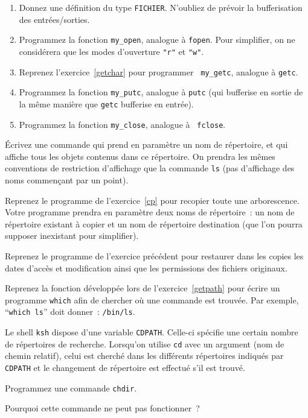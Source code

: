 \begin {enumerate}
    \item Donnez une définition du type {\tt FICHIER}.  N'oubliez de
	prévoir la bufferisation des entrées/sorties.

    \item Programmez la fonction {\tt my\_open}, analogue à {\tt fopen}.
	Pour simplifier, on ne considérera que les modes d'ouverture
	\verb|"r"| et \verb|"w"|.

    \item Reprenez l'exercice~\ref {getchar} pour programmer {\tt
	my\_getc}, analogue à {\tt getc}.

    \item Programmez la fonction {\tt my\_putc}, analogue à {\tt putc}
	(qui bufferise en sortie de la même manière que \texttt {getc}
	bufferise en entrée).

    \item Programmez la fonction {\tt my\_close}, analogue à {\tt
	fclose}.

\end {enumerate}



\question

Écrivez une commande qui prend en paramètre un nom de répertoire, et
qui affiche tous les objets contenus dans ce répertoire. On prendra les
mêmes conventions de restriction d'affichage que la commande {\tt ls}
(pas d'affichage des noms commençant par un point).


\question

Reprenez le programme de l'exercice~\ref {cp} pour recopier toute
une arborescence. Votre programme prendra en paramètre deux noms
de répertoire~: un nom de répertoire existant à copier et un nom
de répertoire destination (que l'on pourra supposer inexistant pour
simplifier).


\question

Reprenez le programme de l'exercice précédent pour restaurer dans les
copies les dates d'accès et modification ainsi que les permissions des
fichiers originaux.


\question

Reprenez la fonction développée lors de l'exercice~\ref {getpath} pour écrire
un programme {\tt which} afin de chercher où une commande est trouvée.
Par exemple, ``{\tt which~ls}'' doit donner~: {\tt /bin/ls}.


\question

Le shell {\tt ksh} dispose d'une variable {\tt CDPATH}.  Celle-ci
spécifie une certain nombre de répertoires de recherche.  Lorsqu'on
utilise {\tt cd} avec un argument (nom de chemin relatif), celui est
cherché dans les différents répertoires indiqués par {\tt CDPATH} et le
changement de répertoire est effectué s'il est trouvé.

Programmez une commande {\tt chdir}.

Pourquoi cette commande ne peut pas fonctionner~?


